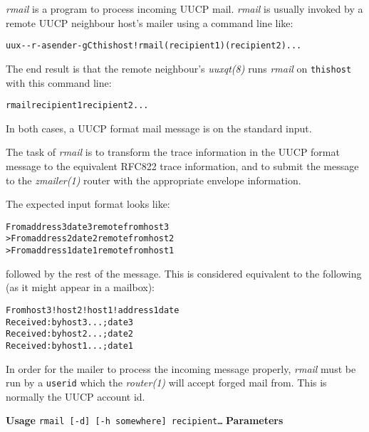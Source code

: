
{\em rmail} is a program to process incoming UUCP mail.
{\em rmail} is usually invoked by a remote UUCP neighbour host's
mailer using a command line like:

\begin{alltt}\small
uux - -r -asender -gC thishost!rmail (recipient1) (recipient2) ...
\end{alltt}


The end result is that the remote neighbour's {\em uuxqt(8)} runs
{\em rmail} on {\tt thishost} with this command line:

\begin{alltt}
rmail recipient1 recipient2 ...
\end{alltt}


In both cases, a UUCP format mail message is on the standard input.

The task of {\em rmail} is to transform the trace information in
the UUCP format message to the equivalent RFC822 trace
information, and to submit the message to the {\em zmailer(1)}
router with the appropriate envelope information.

The expected input format looks like:

\begin{alltt}
From address3  date3 remote from host3
>From address2  date2 remote from host2
>From address1  date1 remote from host1
\end{alltt}


followed by the rest of the message. This is considered
equivalent to the following (as it might appear in a mailbox):

\begin{alltt}
From host3!host2!host1!address1 date
Received: by host3 ... ; date3
Received: by host2 ... ; date2
Received: by host1 ... ; date1
\end{alltt}


In order for the mailer to process the incoming message
properly, {\em rmail} must be run by a {\tt userid} which the
{\em router(1)} will accept forged mail from. This is normally
the UUCP account id.

{\bf Usage}
{\tt rmail [-d] [-h somewhere] recipient\ldots }
{\bf Parameters}

